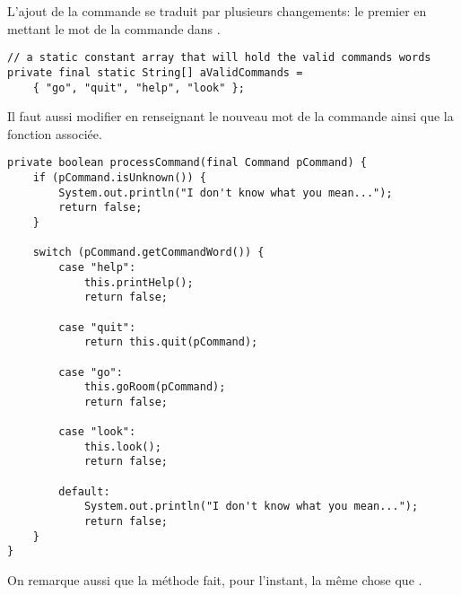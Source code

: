 \begin{exercise}[subtitle=Commande look]

L'ajout de la commande  se traduit par plusieurs changements: le premier en mettant le mot de la commande dans .

\begin{verbatim}
// a static constant array that will hold the valid commands words
private final static String[] aValidCommands = 
    { "go", "quit", "help", "look" };
\end{verbatim}

Il faut aussi modifier  en renseignant le nouveau mot de la commande ainsi que la fonction associée.

\begin{verbatim}
private boolean processCommand(final Command pCommand) {
    if (pCommand.isUnknown()) {
        System.out.println("I don't know what you mean...");
        return false;
    }

    switch (pCommand.getCommandWord()) {
        case "help":
            this.printHelp();
            return false;

        case "quit":
            return this.quit(pCommand);

        case "go":
            this.goRoom(pCommand);
            return false;

        case "look":
            this.look();
            return false;

        default:
            System.out.println("I don't know what you mean...");
            return false;
    }
}
\end{verbatim}

On remarque aussi que la méthode  fait, pour l'instant, la même chose que .
\end{exercise}

